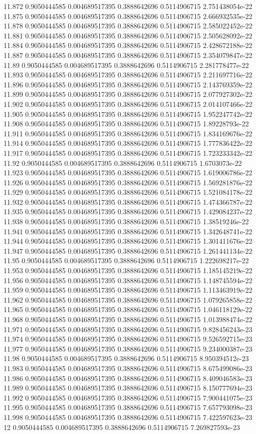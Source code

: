 {11.872 0.9050444585 0.004689517395 0.3888642696 0.5114906715 2.751438054e-22
11.875 0.9050444585 0.004689517395 0.3888642696 0.5114906715 2.666932535e-22
11.878 0.9050444585 0.004689517395 0.3888642696 0.5114906715 2.585022452e-22
11.881 0.9050444585 0.004689517395 0.3888642696 0.5114906715 2.505628092e-22
11.884 0.9050444585 0.004689517395 0.3888642696 0.5114906715 2.428672188e-22
11.887 0.9050444585 0.004689517395 0.3888642696 0.5114906715 2.354079847e-22
11.89 0.9050444585 0.004689517395 0.3888642696 0.5114906715 2.281778477e-22
11.893 0.9050444585 0.004689517395 0.3888642696 0.5114906715 2.211697716e-22
11.896 0.9050444585 0.004689517395 0.3888642696 0.5114906715 2.143769359e-22
11.899 0.9050444585 0.004689517395 0.3888642696 0.5114906715 2.077927302e-22
11.902 0.9050444585 0.004689517395 0.3888642696 0.5114906715 2.014107466e-22
11.905 0.9050444585 0.004689517395 0.3888642696 0.5114906715 1.952247742e-22
11.908 0.9050444585 0.004689517395 0.3888642696 0.5114906715 1.89228793e-22
11.911 0.9050444585 0.004689517395 0.3888642696 0.5114906715 1.834169676e-22
11.914 0.9050444585 0.004689517395 0.3888642696 0.5114906715 1.777836422e-22
11.917 0.9050444585 0.004689517395 0.3888642696 0.5114906715 1.723233342e-22
11.92 0.9050444585 0.004689517395 0.3888642696 0.5114906715 1.6703073e-22
11.923 0.9050444585 0.004689517395 0.3888642696 0.5114906715 1.619006786e-22
11.926 0.9050444585 0.004689517395 0.3888642696 0.5114906715 1.569281876e-22
11.929 0.9050444585 0.004689517395 0.3888642696 0.5114906715 1.521084178e-22
11.932 0.9050444585 0.004689517395 0.3888642696 0.5114906715 1.474366787e-22
11.935 0.9050444585 0.004689517395 0.3888642696 0.5114906715 1.429084237e-22
11.938 0.9050444585 0.004689517395 0.3888642696 0.5114906715 1.38519246e-22
11.941 0.9050444585 0.004689517395 0.3888642696 0.5114906715 1.342648741e-22
11.944 0.9050444585 0.004689517395 0.3888642696 0.5114906715 1.301411676e-22
11.947 0.9050444585 0.004689517395 0.3888642696 0.5114906715 1.261441134e-22
11.95 0.9050444585 0.004689517395 0.3888642696 0.5114906715 1.222698217e-22
11.953 0.9050444585 0.004689517395 0.3888642696 0.5114906715 1.185145219e-22
11.956 0.9050444585 0.004689517395 0.3888642696 0.5114906715 1.148745594e-22
11.959 0.9050444585 0.004689517395 0.3888642696 0.5114906715 1.113463919e-22
11.962 0.9050444585 0.004689517395 0.3888642696 0.5114906715 1.079265858e-22
11.965 0.9050444585 0.004689517395 0.3888642696 0.5114906715 1.046118129e-22
11.968 0.9050444585 0.004689517395 0.3888642696 0.5114906715 1.013988474e-22
11.971 0.9050444585 0.004689517395 0.3888642696 0.5114906715 9.828456243e-23
11.974 0.9050444585 0.004689517395 0.3888642696 0.5114906715 9.526592715e-23
11.977 0.9050444585 0.004689517395 0.3888642696 0.5114906715 9.234000387e-23
11.98 0.9050444585 0.004689517395 0.3888642696 0.5114906715 8.950394512e-23
11.983 0.9050444585 0.004689517395 0.3888642696 0.5114906715 8.675499086e-23
11.986 0.9050444585 0.004689517395 0.3888642696 0.5114906715 8.409046583e-23
11.989 0.9050444585 0.004689517395 0.3888642696 0.5114906715 8.150777694e-23
11.992 0.9050444585 0.004689517395 0.3888642696 0.5114906715 7.900441075e-23
11.995 0.9050444585 0.004689517395 0.3888642696 0.5114906715 7.657793098e-23
11.998 0.9050444585 0.004689517395 0.3888642696 0.5114906715 7.422597623e-23
12 0.9050444585 0.004689517395 0.3888642696 0.5114906715 7.269827593e-23
}\transformerhistory
{}\transformersweep
